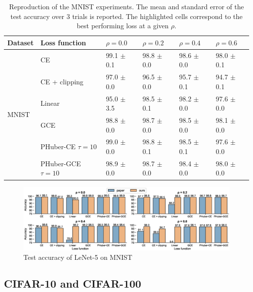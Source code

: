 \begin{table}[htbp]
 \centering
\begin{tabular}{llllll}
\toprule
\textbf{Dataset} &\textbf{Loss function} &   $\rho = 0.0$ &   $\rho = 0.2$ &   $\rho = 0.4$ &   $\rho = 0.6 $ \\
\midrule
\multirow{6}{*}{MNIST} & CE & \cellcolor{light-gray}99.1 $\pm$ 0.1 &  \cellcolor{light-gray}98.8 $\pm$ 0.0 &  \cellcolor{light-gray}98.6 $\pm$ 0.0 &  98.0 $\pm$ 0.1 \\
& CE + clipping   &  97.0 $\pm$ 0.0 &  96.5 $\pm$ 0.0 &  95.7 $\pm$ 0.1  &  94.7 $\pm$ 0.1 \\
& Linear          &  95.0 $\pm$ 3.5 &  98.5 $\pm$ 0.1 &  98.2 $\pm$ 0.0 &  97.6 $\pm$ 0.0 \\
& GCE             &  98.8 $\pm$ 0.0 &  98.7 $\pm$ 0.0 &  98.5 $\pm$ 0.0 & \cellcolor{light-gray}98.1 $\pm$ 0.0 \\
& PHuber-CE $\tau=10$  &  99.0 $\pm$ 0.0 &  98.8 $\pm$ 0.1 &  98.5 $\pm$ 0.1 &  97.6 $\pm$ 0.0 \\
& PHuber-GCE $\tau=10$ &  98.9 $\pm$ 0.0 &  98.7 $\pm$ 0.0 &  98.4 $\pm$ 0.0 &  98.0 $\pm$ 0.0 \\
\bottomrule
\end{tabular}
\caption{Reproduction of the MNIST experiments. The mean and standard error of the test accuracy over 3 trials is reported. The highlighted cells correspond to the best performing loss at a given $\rho$.
}
  \label{tab:mnist-results}
\end{table}

\vspace{-5mm}
\begin{figure}[htbp]
  \centering
  \includegraphics[width=\columnwidth]{figs/mnist.eps}
  \caption{Test accuracy of LeNet-5 on MNIST}
  \label{fig:mnist-comparison}
\end{figure}
\vspace{-3mm}

\subsection{CIFAR-10 and CIFAR-100}

